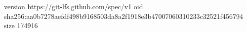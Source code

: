 version https://git-lfs.github.com/spec/v1
oid sha256:aa0b7278aefdf498b9168503da8a2f1918e3b47007060310233c32521f456794
size 174916

